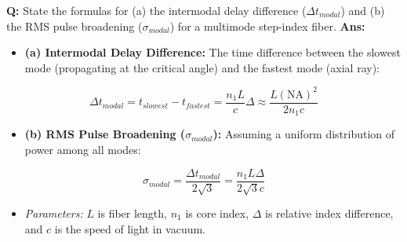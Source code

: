 \documentclass[10pt,a4paper,twocolumn]{article}
\begin{document}
\begin{tcolorbox}[
  colback=white,
  colframe=UnitColorThree,
  colbacktitle=gray!10!white,
  coltitle=black,
  fonttitle=\bfseries\sffamily\small,
  title={Unit III $\bullet$ Card 4: Intermodal Dispersion and RMS Broadening},
  boxrule=1.2pt,
  arc=2mm,
  outer arc=2mm,
  boxsep=1.5mm,
  top=1mm,
  bottom=1mm,
  left=1.5mm,
  right=1.5mm,
  before skip=2.5mm,
  after skip=2.5mm
]
\textbf{Q:} State the formulas for (a) the intermodal delay difference ($\Delta t_{modal}$) and (b) the RMS pulse broadening ($\sigma_{modal}$) for a multimode step-index fiber.
\tcbline
\textbf{Ans:} \begin{itemize}
  \item   \textbf{(a) Intermodal Delay Difference:} The time difference between the slowest mode (propagating at the critical angle) and the fastest mode (axial ray):
\end{itemize}
        \[ \Delta t_{modal} = t_{slowest} - t_{fastest} = \frac{n_1 L}{c} \Delta \approx \frac{L (\text{NA})^2}{2 n_1 c} \]
\begin{itemize}
  \item   \textbf{(b) RMS Pulse Broadening ($\sigma_{modal}$):} Assuming a uniform distribution of power among all modes:
\end{itemize}
        \[ \sigma_{modal} = \frac{\Delta t_{modal}}{2\sqrt{3}} = \frac{n_1 L \Delta}{2\sqrt{3} c} \]
\begin{itemize}
  \item   \textit{Parameters:} $L$ is fiber length, $n_1$ is core index, $\Delta$ is relative index difference, and $c$ is the speed of light in vacuum.
\end{itemize}
\end{tcolorbox}
\end{document}
